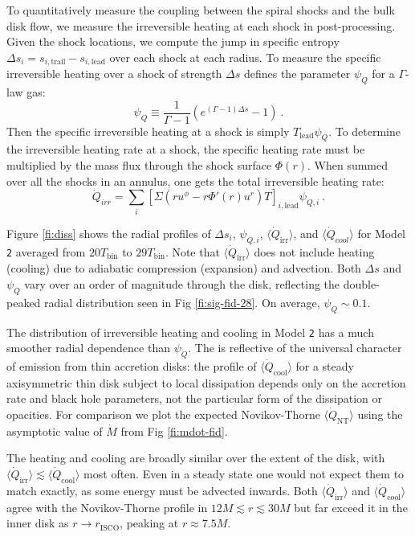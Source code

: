 \documentclass{emulateapj}
\newcommand{\Gam}{\Gamma}
\newcommand{\De}{\Delta}
\newcommand{\model}[1]{{Model \texttt{#1}}}
\newcommand{\avet}[1]{ \langle #1 \rangle}
\begin{document}
To quantitatively measure the coupling between the spiral shocks and the bulk disk flow, we measure the irreversible heating at each shock in post-processing.  Given the shock locations, we compute the jump in specific entropy $\Delta s_i = s_{i,\text{trail}} - s_{i,\text{lead}}$ over each shock at each radius.  To measure the specific irreversible heating over a shock of strength $\De s$ \cite{Rafikov16} defines the parameter $\psi_Q$ for a $\Gam$-law gas:
\begin{equation}
	\psi_Q \equiv \frac{1}{\Gam - 1} \left( e^{(\Gam -1)\De s } - 1 \right) \ . \label{eq:def-psi}
\end{equation}
Then the specific irreversible heating at a shock is simply $T_\text{lead} \psi_Q$.  To determine the irreversible heating rate at a shock, the specific heating rate must be multiplied by the mass flux through the shock surface $\Phi(r)$.  When summed over all the shocks in an annulus, one gets the total irreversible heating rate:
\begin{equation}
	\dot{Q}_{irr} = \sum_i \left[ \Sigma \left(r u^\phi - r \Phi'(r) u^r \right) T \right]_{i,\text{lead}} \psi_{Q,i} \ . \label{eq:QirrRaf}
\end{equation}

Figure \ref{fi:diss} shows the radial profiles of $\Delta s_i$, $\psi_{Q,i}$, $\avet{\dot{Q}_\text{irr}}$, and $\avet{\dot{Q}_{cool}}$ for \model{2} averaged from $20 T_\text{bin}$ to $29 T_\text{bin}$.  Note that $\avet{\dot{Q}_\text{irr}}$ does not include heating (cooling) due to adiabatic compression (expansion) and advection.  Both $\De s$ and $\psi_Q$ vary over an order of magnitude through the disk, reflecting the double-peaked radial distribution seen in Fig \ref{fi:sig-fid-28}. On average, $\psi_Q \sim 0.1$.  

The distribution of irreversible heating and cooling in \model{2} has a much smoother radial dependence than $\psi_Q$. The is reflective of the universal character of emission from thin accretion disks: the profile of $\avet{\dot{Q}_\text{cool}}$ for a steady axisymmetric thin disk subject to local dissipation depends only on the accretion rate and black hole parameters, not the particular form of the dissipation or opacities.  For comparison we plot the expected Novikov-Thorne $\avet{\dot{Q}_\text{NT}}$ using the asymptotic value of $\dot{M}$ from Fig \ref{fi:mdot-fid}. 

The heating and cooling are broadly similar over the extent of the disk, with $\avet{\dot{Q}_\text{irr}} \lesssim \avet{\dot{Q}_\text{cool}}$ most often.  Even in a steady state one would not expect them to match exactly, as some energy must be advected inwards.  Both $\avet{\dot{Q}_\text{irr}}$ and $\avet{\dot{Q}_\text{cool}}$ agree with the Novikov-Thorne profile in $12 M \lesssim r \lesssim 30M$ but far exceed it in the inner disk as $r \to r_\text{ISCO}$, peaking at $r \approx 7.5M$.
\end{document}
